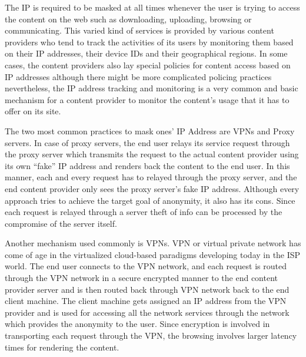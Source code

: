 \documentclass[10pt, a4paper, twocolumn]{article} %
\begin{document}
The IP is required to be masked at all times whenever the user is trying to access the content on the web such as downloading, uploading, browsing or communicating. This varied kind of services is provided by various content providers who tend to track the activities of its users by monitoring them based on their IP addresses, their device IDs and their geographical regions. In some cases, the content providers also lay special policies for content access based on IP addresses although there might be more complicated policing practices nevertheless, the IP address tracking and monitoring is a very common and basic mechanism for a content provider to monitor the content’s usage that it has to offer on its site.\newline

The two most common practices to mask ones’ IP Address are VPNs and Proxy servers. In case of proxy servers, the end user relays its service request through the proxy server which transmits the request to the actual content provider using its own “fake” IP address and renders back the content to the end user. In this manner, each and every request has to relayed through the proxy server, and the end content provider only sees the proxy server’s fake IP address. Although every approach tries to achieve the target goal of anonymity, it also has its cons. Since each request is relayed through a server theft of info can be processed by the compromise of the server itself.\newline

Another mechanism used commonly is VPNs. VPN or virtual private network has come of age in the virtualized cloud-based paradigms developing today in the ISP world. The end user connects to the VPN network, and each request is routed through the VPN network in a secure encrypted manner to the end content provider server and is then routed back through VPN network back to the end client machine. The client machine gets assigned an IP address from the VPN provider and is used for accessing all the network services through the network which provides the anonymity to the user. Since encryption is involved in transporting each request through the VPN, the browsing involves larger latency times for rendering the content.\newline
\end{document}

